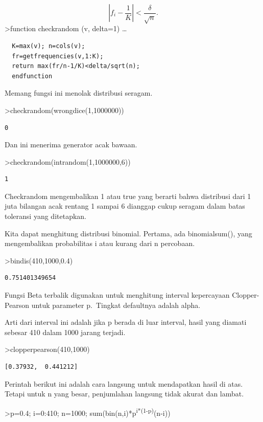 \documentclass[
]{book}
\begin{document}
\[\left|f_i-\frac{1}{K}\right| < \frac{\delta}{\sqrt{n}}.\]\textgreater function checkrandom (v, delta=1) \ldots{}

\begin{verbatim}
  K=max(v); n=cols(v);
  fr=getfrequencies(v,1:K);
  return max(fr/n-1/K)<delta/sqrt(n);
  endfunction
\end{verbatim}

Memang fungsi ini menolak distribusi seragam.

\textgreater checkrandom(wrongdice(1,1000000))

\begin{verbatim}
0
\end{verbatim}

Dan ini menerima generator acak bawaan.

\textgreater checkrandom(intrandom(1,1000000,6))

\begin{verbatim}
1
\end{verbatim}

Checkrandom mengembalikan 1 atau true yang berarti bahwa distribusi dari 1 juta bilangan acak rentang 1 sampai 6 dianggap cukup seragam dalam batas toleransi yang ditetapkan.

Kita dapat menghitung distribusi binomial. Pertama, ada binomialsum(), yang mengembalikan probabilitas i atau kurang dari n percobaan.

\textgreater bindis(410,1000,0.4)

\begin{verbatim}
0.751401349654
\end{verbatim}

Fungsi Beta terbalik digunakan untuk menghitung interval kepercayaan Clopper-Pearson untuk parameter p.~Tingkat defaultnya adalah alpha.

Arti dari interval ini adalah jika p berada di luar interval, hasil yang diamati sebesar 410 dalam 1000 jarang terjadi.

\textgreater clopperpearson(410,1000)

\begin{verbatim}
[0.37932,  0.441212]
\end{verbatim}

Perintah berikut ini adalah cara langsung untuk mendapatkan hasil di atas. Tetapi untuk n yang besar, penjumlahan langsung tidak akurat dan lambat.

\textgreater p=0.4; i=0:410; n=1000; sum(bin(n,i)*p\textsuperscript{i*(1-p)}(n-i))
\end{document}
